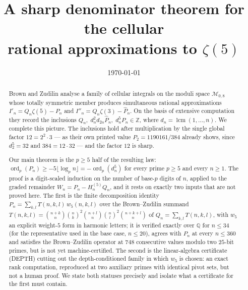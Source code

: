 \documentclass[11pt,reqno]{amsart}
\theoremstyle{plain}
\theoremstyle{definition}
\theoremstyle{remark}
\numberwithin{equation}{section}
\newcommand{\ZZ}{\mathbb{Z}}
\newcommand{\QQ}{\mathbb{Q}}
\newcommand{\ord}{\operatorname{ord}}
\newcommand{\lcm}{\operatorname{lcm}}
\begin{document}
\title[A sharp denominator theorem for cellular approximations to $\zeta(5)$]
{A sharp denominator theorem for the cellular\\ rational approximations to $\zeta(5)$}

\author{}
\address{}
\email{}

\date{\today}


\begin{abstract}
Brown and Zudilin analyse a family of cellular integrals on the moduli space
$\mathcal M_{0,8}$ whose totally symmetric member produces simultaneous rational
approximations $I'_n=Q_n\zeta(5)-P_n$ and $I''_n=Q_n\zeta(3)-\hat P_n$. On the basis of
extensive computation they record the inclusions
$Q_n,\;d_n^2d_{2n}\hat P_n,\;d_n^5P_n\in\ZZ$, where $d_n=\lcm(1,\dots,n)$. We complete this
picture. The inclusions hold after multiplication by the single global factor
$12=2^2\cdot 3$ --- as their own printed value $P_2=1190161/384$ already shows, since
$d_2^5=32$ and $384=12\cdot 32$ --- and the factor $12$ is sharp.

Our main theorem is the $p\ge5$ half of the resulting law:
$\ord_p(P_n)\ge-5\lfloor\log_p n\rfloor=-\ord_p(d_n^5)$ for every prime $p\ge5$ and every
$n\ge1$. The proof is a digit-scaled induction on the number of base-$p$ digits of $n$,
applied to the graded remainder $W_n=P_n-H^{(5)}_nQ_n$, and it rests on exactly two inputs
that are not proved here. The first is the finite decomposition identity
$P_n=\sum_{k,l}T(n,k,l)\,w_5(n,k,l)$ over the Brown--Zudilin summand
$T(n,k,l)=\binom{n+k}{n}\binom{n}{k}^2\binom{n+l}{n}\binom{n}{l}^2\binom{n+k+l}{n}$ of
$Q_n=\sum_{k,l}T(n,k,l)$, with $w_5$ an explicit weight-$5$ form in harmonic letters; it is
verified exactly over $\QQ$ for $n\le34$ (for the representative used in the base case,
$n\le20$), agrees with $P_n$ at every $n\le360$ and satisfies the Brown--Zudilin operator at
$748$ consecutive values modulo two $25$-bit primes, but is not yet machine-certified. The
second is the linear-algebra certificate (DEPTH) cutting out the depth-conditioned family in
which $w_5$ is chosen: an exact rank computation, reproduced at two auxiliary primes with
identical pivot sets, but not a human proof. We state both statuses precisely and isolate what
a certificate for the first must contain.


\end{abstract}
\end{document}
